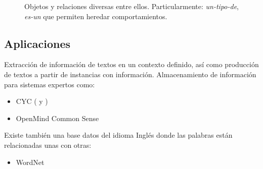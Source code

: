 \begin{figure}
 \centering
  \caption{Objetos y relaciones diversas entre ellos.  Particularmente: \emph{un-tipo-de}, \emph{es-un} que permiten heredar comportamientos.}
\end{figure}


\subsection{Aplicaciones}
Extracción de información de textos en un contexto definido, así como producción de textos a partir de instancias con información.
Almacenamiento de información para sistemas expertos como:
\begin{itemize}
 \item CYC ( y )
 \item OpenMind Common Sense 
\end{itemize}

Existe también una base datos del idioma Inglés donde las palabras están relacionadas unas con otras:
\begin{itemize}
 \item WordNet 
\end{itemize}
 
%
